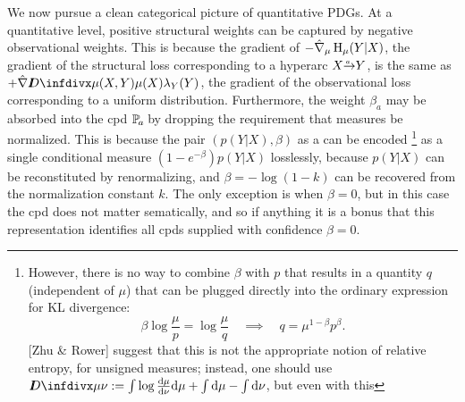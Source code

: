 We now pursue a clean categorical picture of quantitative PDGs.
At a quantitative level, positive structural weights can be captured by negative observational weights.
This is because the gradient of $-\hat\nabla_\mu \operatorname{\mathrm{H}}_\mu(Y|X)$, the gradient of the structural loss corresponding to a hyperarc $\ed aXY$, is the same as $+\hat\nabla\kldiv{\mu(X,Y)}{\mu(X) \lambda_Y(Y)}$, the gradient of the observational loss corresponding to a uniform distribution.
Furthermore, the weight $\beta_a$ may be absorbed into the cpd $\p_a$ by  dropping the requirement that measures be normalized. 
This is because the pair $(p(Y|X), \beta)$ as a
can be encoded
\unskip\footnote{%
However, there is no way 
to combine $\beta$ with $p$ that results in a quantity $q$ (independent of $\mu$) that can be plugged directly into the ordinary expression for KL divergence:
\[
    \beta \log \frac \mu p = \log \frac \mu q \quad\implies\quad
        q = \mu^{1-\beta}p^\beta.
\]
[Zhu \& Rower] suggest that this is not the appropriate notion of relative entropy, for unsigned measures; instead, one should use $\kldiv \mu\nu := \int \log \frac{\mathrm d\mu}{\mathrm d\nu} \mathrm d\mu + \int \mathrm d\mu - \int \mathrm d\nu$, but even with this 
}
as a single conditional measure
$
    (1-e^{-\beta}) p(Y|X)
$
losslessly, because $p(Y|X)$ can be reconstituted by renormalizing, and $\beta = - \log (1-k)$ can be recovered from the normalization constant $k$.
The only exception is when $\beta=0$, but in this case the cpd does not matter sematically, and so if anything it is a bonus that this representation identifies all cpds supplied with confidence $\beta=0$.

